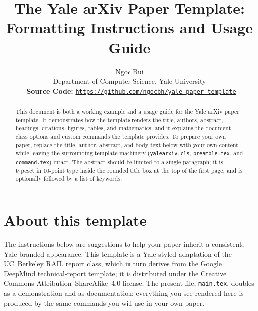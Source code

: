 \documentclass[11pt,letterpaper,logo]{yalearxiv}
\title{The Yale arXiv Paper Template:\\ Formatting Instructions and Usage Guide}
\author{Ngoc Bui\yale\\
\yale Department of Computer Science, Yale University\\
\faGithub~\textbf{Source Code:} \href{https://github.com/ngocbh/yale-paper-template}{\texttt{https://github.com/ngocbh/yale-paper-template}}
}
\begin{document}
\begin{abstract}
This document is both a working example and a usage guide for the Yale arXiv paper template. It demonstrates how the template renders the title, authors, abstract, headings, citations, figures, tables, and mathematics, and it explains the document-class options and custom commands the template provides. To prepare your own paper, replace the title, author, abstract, and body text below with your own content while leaving the surrounding template machinery (\texttt{yalearxiv.cls}, \texttt{preamble.tex}, and \texttt{command.tex}) intact. The abstract should be limited to a single paragraph; it is typeset in $10$-point type inside the rounded title box at the top of the first page, and is optionally followed by a list of keywords.
\end{abstract}


\maketitle


\section{About this template}
\label{sec:about}

The instructions below are suggestions to help your paper inherit a
consistent, Yale-branded appearance. This template is a Yale-styled adaptation of
the UC~Berkeley RAIL report class, which in turn derives from the Google DeepMind
technical-report template; it is distributed under the Creative Commons
Attribution--ShareAlike~4.0 license. The present file, \verb+main.tex+,
doubles as a demonstration and as documentation: everything you see rendered here
is produced by the same commands you will use in your own paper.
\end{document}
